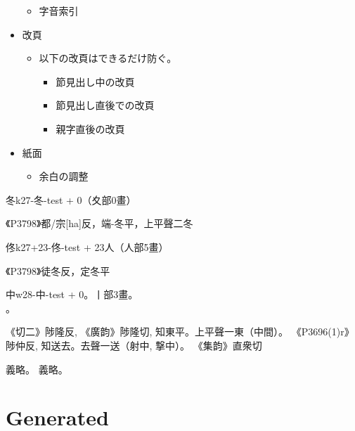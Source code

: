 \documentclass[a5paper,10pt,twoside]{article}
\begin{document}
\begin{itemize}
\begin{itemize}
\begin{itemize}
    \end{itemize}
  \item{} 字音索引
  \end{itemize}
\item{} 改頁
  \begin{itemize}
  \item{} 以下の改頁はできるだけ防ぐ。
    \begin{itemize}
    \item{} 節見出し中の改頁
    \item{} 節見出し直後での改頁
    \item{} 親字直後の改頁
    \end{itemize}
  \end{itemize}
\item{} 紙面
  \begin{itemize}
  \item{} 余白の調整
  \end{itemize}
\end{itemize}


\begin{Entry}{冬}{{k}}{27-冬-test}
  + 0（夊部0畫）
  \\
  \begin{Sound}
    《P3798》都/宗[ha]反，端-冬平，上平聲二冬
  \end{Sound}
\end{Entry}

\begin{Entry}{佟}{{k}}{27+23-佟-test}
  + 23人（人部5畫）
  \\
  \begin{Sound}
    《P3798》徒冬反，定冬平
  \end{Sound}
\end{Entry}


\begin{Entry}{中}{{w}}{28-中-test}%
  + 0。丨部3畫。
  \\
  。
  \begin{Sound}
    《切二》陟隆反, 《廣韵》陟隆切, 知東平。上平聲一東（中間）。
    《P3696(1)r》陟仲反, 知送去。去聲一送（射中, 撃中）。
    《集韵》直衆切
  \end{Sound}
  \begin{Sense}
    義略。
    義略。
  \end{Sense}
\end{Entry}

\cleardoublepage{}
\part{Generated}

\end{document}
